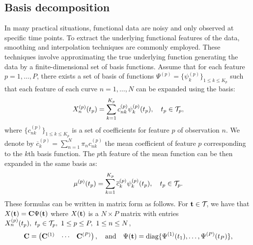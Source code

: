 \subsection{Basis decomposition} %
\label{sub:basis_decomposition}


In many practical situations, functional data are noisy and only observed at specific time points. To extract the underlying functional features of the data, smoothing and interpolation techniques are commonly employed. These techniques involve approximating the true underlying function generating the data by a finite-dimensional set of basis functions. Assume that for each feature $p = 1, \dots, P$, there exists a set of basis of functions $\Psi^{(p)} = \{\psi_k^{(p)}\}_{1 \leq k \leq K_p}$ such that each feature of each curve $n = 1, \dots, N$ can be expanded using the basis:
\begin{equation}\label{eq:curve_basis_expansion}
X_n^{(p)}(t_p) = \sum_{k = 1}^{K_p} c^{(p)}_{nk}\psi_k^{(p)}(t_p), \quad t_p \in \mathcal{T}_{p},
\end{equation}
where $\{c^{(p)}_{nk}\}_{1 \leq k \leq K_p}$ is a set of coefficients for feature $p$ of observation $n$. We denote by $\overline{c}_k^{(p)} = \sum_{n = 1}^N \pi_n c^{(p)}_{nk}$ the mean coefficient of feature $p$ corresponding to the $k$th basis function.
The $p$th feature of the mean function can be then expanded in the same basis as:
\begin{equation}
    \mu^{(p)}(t_p) = \sum_{k = 1}^{K_p} \overline{c}_k^{(p)}\psi_k^{(p)}(t_p), \quad t_p \in \mathcal{T}_{p}.
\end{equation}
These formulas can be written in matrix form as follows. For $\mathbf{t} \in \mathcal{T}_{}$, we have that $X(\mathbf{t}) = \mathbf{C}\Psi(\mathbf{t})$ where $X(\mathbf{t})$ is a $N \times P$ matrix with entries $X_n^{(p)}(t_p),~t_p \in \mathcal{T}_{p},~1 \leq p \leq P,~1 \leq n \leq N$,
\begin{equation}
    \mathbf{C} = \begin{pmatrix}
            \mathbf{C}^{(1)} & \cdots & \mathbf{C}^{(P)} \\
        \end{pmatrix}, \quad \text{and}\quad
    \Psi(\mathbf{t}) = \text{diag}\{\Psi^{(1)}(t_1), \dots, \Psi^{(P)}(t_P)\},
\end{equation}
